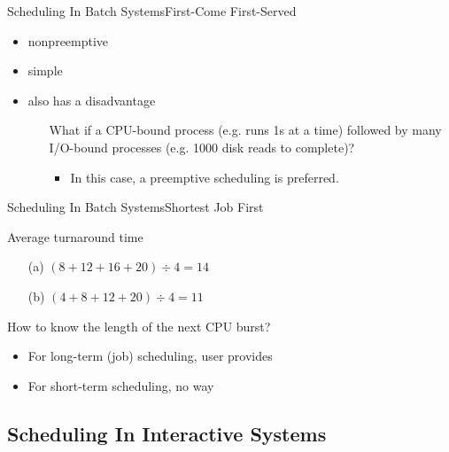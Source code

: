 \begin{frame}{Scheduling In Batch Systems}{First-Come First-Served}
  \begin{itemize}
  \item nonpreemptive
  \item simple
  \item also has a disadvantage
    \begin{itemize}
    \item[] What if a CPU-bound process (e.g. runs 1s at a time) followed by many I/O-bound
      processes (e.g. 1000 disk reads to complete)?
      \begin{itemize}
      \item In this case, a preemptive scheduling is preferred.
      \end{itemize}
    \end{itemize}
  \end{itemize}
\end{frame}

\begin{frame}{Scheduling In Batch Systems}{Shortest Job First}
  \begin{center}
     
  \end{center}
  \begin{block}{Average turnaround time}
    \begin{itemize}
    \item[(a)] $(8+12+16+20)\div{}4=14$
    \item[(b)] $(4+8+12+20)\div{}4=11$
    \end{itemize}
  \end{block}
  How to know the length of the next CPU burst?
  \begin{itemize}
  \item For long-term (job) scheduling, user provides
  \item For short-term scheduling, no way
  \end{itemize}
\end{frame}

\subsection{Scheduling In Interactive Systems}
\label{sec:sched-inter-syst}

